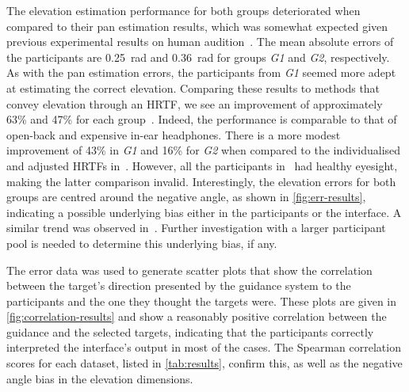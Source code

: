 \documentclass{llncs}
\begin{document}
The elevation estimation performance for both groups deteriorated when compared to their pan estimation results, which was somewhat expected given previous experimental results on human audition~\cite{barfield1997visual}. 
The mean absolute errors of the participants are \SI{0.25}{\radian} and \SI{0.36}{\radian} for groups \textit{G1} and \textit{G2}, respectively.
As with the pan estimation errors, the participants from \textit{G1} seemed more adept at estimating the correct elevation.
Comparing these results to methods that convey elevation through an HRTF, we see an improvement of approximately 63\% and 47\% for each group~\cite{schonstein2008comparison}. 
Indeed, the performance is comparable to that of open-back and expensive in-ear headphones.
There is a more modest improvement of 43\% in \textit{G1} and 16\% for \textit{G2} when compared to the individualised and adjusted HRTFs in~\cite{stanley2006lateralization}.
However, all the participants in~\cite{stanley2006lateralization} had healthy eyesight, making the latter comparison invalid. 
Interestingly, the elevation errors for both groups are centred around the negative angle, as shown in \cref{fig:err-results}, indicating a possible underlying bias either in the participants or the interface.
A similar trend was observed in~\cite{stanley2006lateralization}. Further investigation with a larger participant pool is needed to determine this underlying bias, if any. 

The error data was used to generate scatter plots that show the correlation between the target's direction presented by the guidance system to the participants and the one they thought the targets were.
These plots are given in \cref{fig:correlation-results} and show a reasonably positive correlation between the guidance and the selected targets, indicating that the participants correctly interpreted the interface's output in most of the cases. 
The Spearman correlation scores for each dataset, listed in \cref{tab:results}, confirm this, as well as the negative angle bias in the elevation dimensions.
\end{document}
